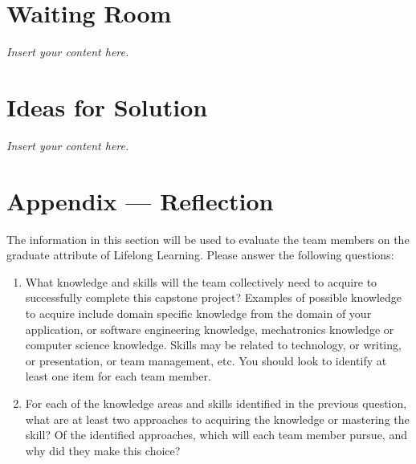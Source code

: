 \documentclass[12pt]{article}
\newcommand{\lips}{\textit{Insert your content here.}}
\begin{document}
\section{Waiting Room}
\lips

\section{Ideas for Solution}
\lips

\newpage{}
\section*{Appendix --- Reflection}

The information in this section will be used to evaluate the team members on the
graduate attribute of Lifelong Learning.  Please answer the following questions:

\begin{enumerate}
  \item What knowledge and skills will the team collectively need to acquire to
  successfully complete this capstone project?  Examples of possible knowledge
  to acquire include domain specific knowledge from the domain of your
  application, or software engineering knowledge, mechatronics knowledge or
  computer science knowledge.  Skills may be related to technology, or writing,
  or presentation, or team management, etc.  You should look to identify at
  least one item for each team member.
  \item For each of the knowledge areas and skills identified in the previous
  question, what are at least two approaches to acquiring the knowledge or
  mastering the skill?  Of the identified approaches, which will each team
  member pursue, and why did they make this choice?
\end{enumerate}
\end{document}
